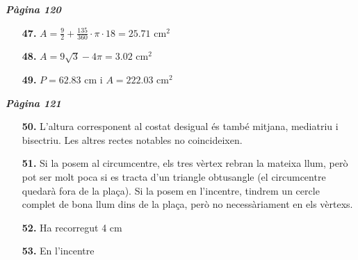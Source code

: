 \documentclass[a4paper, pdf, twoside]{book}
\begin{document}
\begin{multicols}{2}
{\textbf{\em Pàgina 120}} \hrulefill
\begin{enumerate}
\vspace{0.25cm}
\item[\fontfamily{phv}\selectfont\color{blue}\textbf{47. }]  \scalebox{0.6}{\simbolclau } 
$A=\frac {9}{2}+ \frac {135}{360} \cdot \pi \cdot 18 = 25.71$ cm$^2$
 \end{enumerate}
\begin{enumerate}
\vspace{0.25cm}
\item[\fontfamily{phv}\selectfont\color{blue}\textbf{48. }] 
$A=9\sqrt {3}-4\pi =3.02$ cm$^2$
\vspace{0.25cm}
\item[\fontfamily{phv}\selectfont\color{blue}\textbf{49. }]  \scalebox{0.6}{\simbolclau } 
$P=62.83$ cm i $A=222.03$ cm$^2$
 \end{enumerate}
\vspace{0.3cm}


{\textbf{\em Pàgina 121}} \hrulefill
\begin{enumerate}
\vspace{0.25cm}
\item[\fontfamily{phv}\selectfont\color{blue}\textbf{50. }] 
 L'altura corresponent al costat desigual és també mitjana, mediatriu i bisectriu. Les altres rectes notables no coincideixen.
 \end{enumerate}
\begin{enumerate}
\vspace{0.25cm}
\item[\fontfamily{phv}\selectfont\color{blue}\textbf{51. }] 
 Si la posem al circumcentre, els tres vèrtex rebran la mateixa llum, però pot ser molt poca si es tracta d'un triangle obtusangle (el circumcentre quedarà fora de la plaça). Si la posem en l'incentre, tindrem un cercle complet de bona llum dins de la plaça, però no necessàriament en els vèrtexs.
\vspace{0.25cm}
\item[\fontfamily{phv}\selectfont\color{blue}\textbf{52. }] 
Ha recorregut 4 cm
\vspace{0.25cm}
\item[\fontfamily{phv}\selectfont\color{blue}\textbf{53. }] 
En l'incentre
 \end{enumerate}
\vspace{0.3cm}



\end{multicols}
\end{document}
